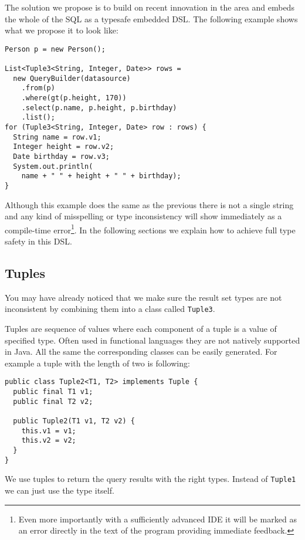 \documentclass{sig-alternate}
\begin{document}
The solution we propose is to build on recent innovation in the area and embeds the whole of the SQL as a typesafe embedded DSL. The following example shows what we propose it to look like:

\begin{verbatim}
Person p = new Person(); 

List<Tuple3<String, Integer, Date>> rows =
  new QueryBuilder(datasource)
    .from(p)
    .where(gt(p.height, 170))
    .select(p.name, p.height, p.birthday)
    .list();
for (Tuple3<String, Integer, Date> row : rows) {
  String name = row.v1;
  Integer height = row.v2;
  Date birthday = row.v3;
  System.out.println(
    name + " " + height + " " + birthday);
}
\end{verbatim}

Although this example does the same as the previous there is not a single string and any kind of misspelling or type inconsistency will show immediately as a compile-time error\footnote{Even more importantly with a sufficiently advanced IDE it will be marked as an error directly in the text of the program providing immediate feedback.}. In the following sections we explain how to achieve full type safety in this DSL.

\subsection{Tuples}

You may have already noticed that we make sure the result set types are not inconsistent by combining them into a class called \verb!Tuple3!.

Tuples are sequence of values where each component of a tuple is a value of specified type. Often used in functional languages they are not natively supported in Java. All the same the corresponding classes can be easily generated. For example a tuple with the length of two is following:

\begin{verbatim}
public class Tuple2<T1, T2> implements Tuple {
  public final T1 v1;
  public final T2 v2;

  public Tuple2(T1 v1, T2 v2) {
    this.v1 = v1;
    this.v2 = v2;
  }		
}
\end{verbatim}

We use tuples to return the query results with the right types. Instead of \verb!Tuple1! we can just use the type itself.
\end{document}
